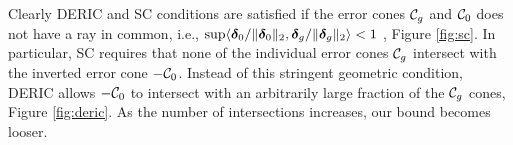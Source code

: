 \begin{remark}
Clearly DERIC and SC conditions are satisfied if the error cones $\cC_g$ and $\cC_0$ does not have a ray in common, i.e., $\sup \langle \boldsymbol{\delta}_0/\|\boldsymbol{\delta}_0\|_{2}, \boldsymbol{\delta}_g/\|\boldsymbol{\delta}_g\|_{2} \rangle < 1$ \cite{trop15, guba16}, Figure \ref{fig:sc}. 
In particular, SC requires that none of the individual error cones $\cC_g$ intersect with the inverted error cone $-\cC_0$.
Instead of this stringent geometric condition, DERIC allows $-\cC_0$ to intersect with an arbitrarily large fraction of the $\cC_g$ cones, Figure \ref{fig:deric}.
As the number of intersections increases, our bound becomes looser.
\end{remark}

%


